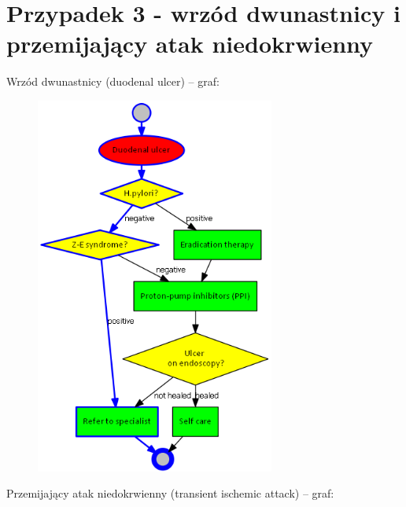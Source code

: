 \section{Przypadek 3 - wrzód dwunastnicy i przemijający atak niedokrwienny}

Wrzód dwunastnicy (duodenal ulcer) – graf:
\begin{figure}[H]
\centering
\includegraphics[width=0.7\textwidth]{img/du.png}
\end{figure}
\newpage
Przemijający atak niedokrwienny (transient ischemic attack) – graf:
